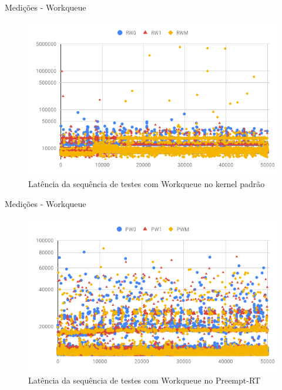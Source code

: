 \documentclass[12pt,brazil]{beamer}
\begin{document}
\begin{frame}{Medições - Workqueue}
    
    \begin{figure}[!htb]
        \centering
        \includegraphics[width=\textwidth]{figures/rw-scatter.png}
        \caption*{Latência da sequência de testes com Workqueue no kernel padrão}
        \label{grafico:r-softirq}
    \end{figure}

\end{frame}

\begin{frame}{Medições - Workqueue}
    
    \begin{figure}[!htb]
        \centering
        \includegraphics[width=\textwidth]{figures/pw-scatter.png}
        \caption*{Latência da sequência de testes com Workqueue no Preempt-RT}
        \label{grafico:r-softirq}
    \end{figure}

\end{frame}
\end{document}
